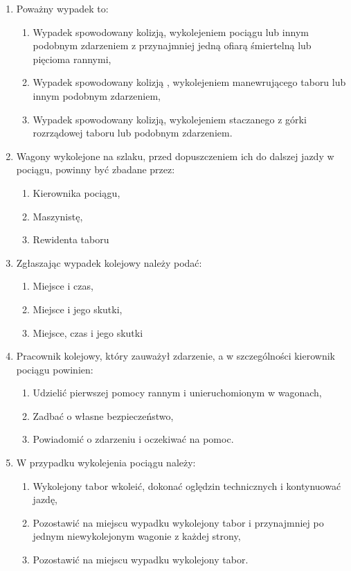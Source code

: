 \begin{tcolorbox}[colback=black!5!white,colframe=green!75!black,width=18cm,title=Podsumowanie rozdziału]
	\begin{enumerate}
		\item Poważny wypadek to:
		\begin{enumerate}
			\item Wypadek spowodowany kolizją, wykolejeniem pociągu lub innym podobnym zdarzeniem z przynajmniej jedną ofiarą śmiertelną lub pięcioma rannymi,
			\item Wypadek spowodowany kolizją , wykolejeniem manewrującego taboru lub innym podobnym zdarzeniem,
			\item Wypadek spowodowany kolizją, wykolejeniem staczanego z górki rozrządowej taboru lub podobnym zdarzeniem.
		\end{enumerate}
		\item Wagony wykolejone na szlaku, przed dopuszczeniem ich do dalszej jazdy w pociągu, powinny być zbadane przez:
		\begin{enumerate}
			\item Kierownika pociągu,
			\item Maszynistę,
			\item Rewidenta taboru
		\end{enumerate}
		\item Zgłaszając wypadek kolejowy należy podać:
		\begin{enumerate}
			\item Miejsce i czas,
			\item Miejsce i jego skutki,
			\item Miejsce, czas i jego skutki
		\end{enumerate}
		\item Pracownik kolejowy, który zauważył zdarzenie, a w szczególności kierownik pociągu powinien:
		\begin{enumerate}
			\item Udzielić pierwszej pomocy rannym i unieruchomionym w wagonach,
			\item Zadbać o własne bezpieczeństwo,
			\item Powiadomić o zdarzeniu i oczekiwać na pomoc.
		\end{enumerate}
		\item W przypadku wykolejenia pociągu należy:
		\begin{enumerate}
			\item Wykolejony tabor wkoleić, dokonać oględzin technicznych i kontynuować jazdę,
			\item Pozostawić na miejscu wypadku wykolejony tabor i przynajmniej po jednym niewykolejonym wagonie z każdej strony,
			\item Pozostawić na miejscu wypadku wykolejony tabor.
		\end{enumerate}
	\end{enumerate}
	
\end{tcolorbox}

